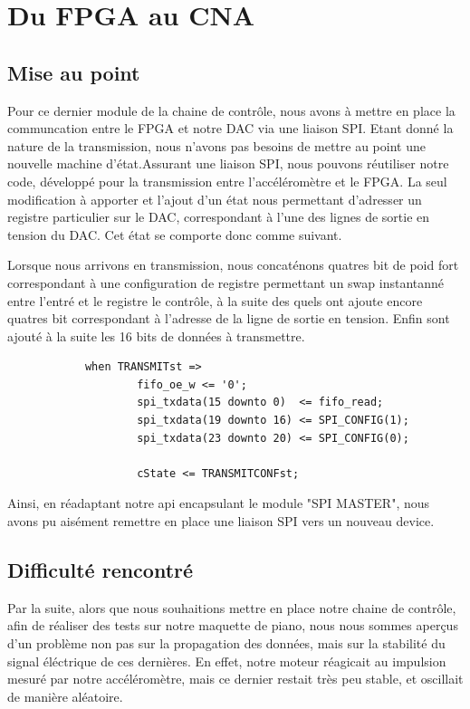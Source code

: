 \documentclass[french,a4paper,12pt]{report}
\begin{document}
	\chapter{Du FPGA au CNA}
	
	\section{Mise au point}
	
	Pour ce dernier module de la chaine de contrôle, nous avons à mettre en place la communcation entre le FPGA et notre DAC via une liaison SPI. Etant donné la nature de la transmission, nous n'avons pas besoins de mettre au point une nouvelle machine d'état.Assurant une liaison SPI, nous pouvons réutiliser notre code, développé pour la transmission entre l'accéléromètre et le FPGA. La seul modification à apporter et l'ajout d'un état nous permettant d'adresser un registre particulier sur le DAC, correspondant à l'une des lignes de sortie en tension du DAC. Cet état se comporte donc comme suivant.
	
	Lorsque nous arrivons en transmission, nous concaténons quatres bit de poid fort correspondant à une configuration de registre permettant un swap instantanné entre l'entré et le registre le contrôle, à la suite des quels ont ajoute encore quatres bit correspondant à l'adresse de la ligne de sortie en tension. Enfin sont ajouté à la suite les 16 bits de données à transmettre.
	
		\begin{lstlisting}
 			when TRANSMITst =>
					fifo_oe_w <= '0';
					spi_txdata(15 downto 0)	 <= fifo_read;
					spi_txdata(19 downto 16) <= SPI_CONFIG(1);
					spi_txdata(23 downto 20) <= SPI_CONFIG(0);
					
					cState <= TRANSMITCONFst;
		\end{lstlisting}
		
		Ainsi, en réadaptant notre api encapsulant le module "SPI MASTER", nous avons pu aisément remettre en place une liaison SPI vers un nouveau device.
		
		\section{Difficulté rencontré}
		
		Par la suite, alors que nous souhaitions mettre en place notre chaine de contrôle, afin de réaliser des tests sur notre maquette de piano, nous nous sommes aperçus d'un problème non pas sur la propagation des données, mais sur la stabilité du signal éléctrique de ces dernières. En effet, notre moteur réagicait au impulsion mesuré par notre accéléromètre, mais ce dernier restait très peu stable, et oscillait de manière aléatoire.
		
\end{document}
